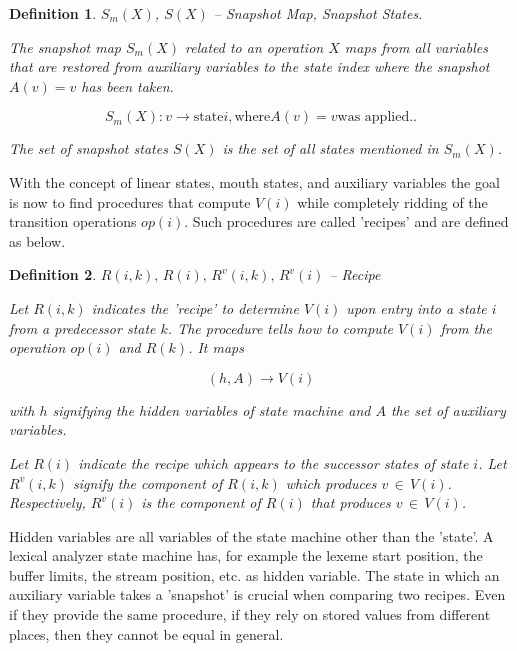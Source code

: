 \documentclass[12pt,a4paper]{scrartcl}
\newtheorem{definition}{Definition}
\begin{document}
\begin{definition} $S_m(X)$, $S(X)$ -- Snapshot Map, Snapshot States.

    The snapshot map $S_m(X)$ related to an operation $X$ maps from all
    variables that are restored from auxiliary variables to the state index
    where the snapshot $A(v)=v$ has been taken.
    
    \begin{equation}
        \label{eq:snapshot-map}
        S_m(X):  v \rightarrow \mbox{state} i, \mbox{where} A(v) = v \mbox{was applied.}.
    \end{equation}

    The set of snapshot states $S(X)$ is the set of all states mentioned in
    $S_m(X)$.

\end{definition}

With the concept of linear states, mouth states, and auxiliary variables the
goal is now to find procedures that compute $V(i)$ while completely ridding
of the transition operations $op(i)$. Such procedures are called 'recipes'
and are defined as below.

\begin{definition}
    $R(i,k),\,R(i),\,R^v(i,k),\,R^v(i)$ -- Recipe 

Let $R(i,k)$ indicates the 'recipe' to determine $V(i)$ upon entry into a state
$i$ from a predecessor state $k$.  The \textit{procedure} tells how to compute
$V(i)$ from the operation $op(i)$ and $R(k)$.  It maps

\begin{equation} \label{eq:recipe-procedure}
    (h, A) \rightarrow V(i)                                             
\end{equation}

with $h$ signifying the hidden variables of state machine and $A$ the set of
auxiliary variables.  

Let $R(i)$ indicate the recipe which appears to the successor states of
state $i$.  Let $R^v(i,k)$ signify the component of $R(i,k)$ which produces
$v\,\in\,V(i)$.  Respectively, $R^v(i)$ is the component of $R(i)$ that
produces $v\,\in\,V(i)$.

\end{definition}

Hidden variables are all variables of the state machine other than the 'state'.
A lexical analyzer state machine has, for example the lexeme start position,
the buffer limits, the stream position, etc. as hidden variable. The state
in which an auxiliary variable takes a 'snapshot' is crucial when comparing
two recipes. Even if they provide the same procedure, if they rely on stored
values from different places, then they cannot be equal in general.
\end{document}
